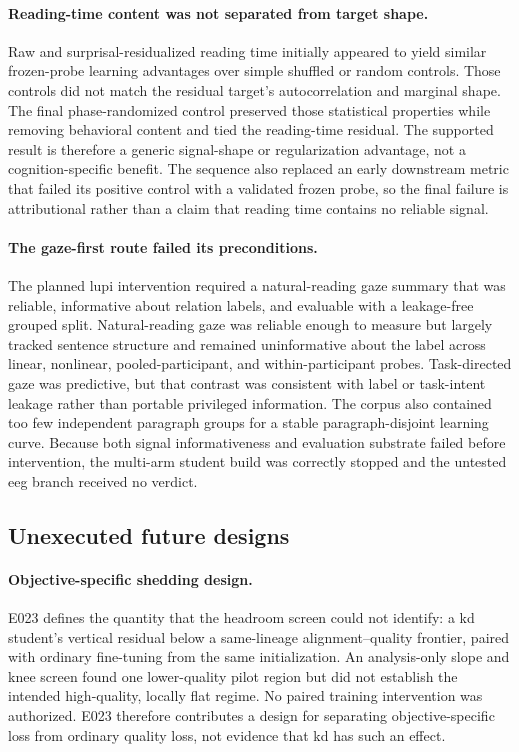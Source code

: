 \paragraph{Reading-time content was not separated from target shape.}
Raw and surprisal-residualized reading time initially appeared to yield similar frozen-probe learning advantages over simple shuffled or random controls.
Those controls did not match the residual target's autocorrelation and marginal shape.
The final phase-randomized control preserved those statistical properties while removing behavioral content and tied the reading-time residual.
The supported result is therefore a generic signal-shape or regularization advantage, not a cognition-specific benefit.
The sequence also replaced an early downstream metric that failed its positive control with a validated frozen probe, so the final failure is attributional rather than a claim that reading time contains no reliable signal. 

\paragraph{The gaze-first route failed its preconditions.}
The planned \ac{lupi} intervention required a natural-reading gaze summary that was reliable, informative about relation labels, and evaluable with a leakage-free grouped split.
Natural-reading gaze was reliable enough to measure but largely tracked sentence structure and remained uninformative about the label across linear, nonlinear, pooled-participant, and within-participant probes.
Task-directed gaze was predictive, but that contrast was consistent with label or task-intent leakage rather than portable privileged information.
The corpus also contained too few independent paragraph groups for a stable paragraph-disjoint learning curve.
Because both signal informativeness and evaluation substrate failed before intervention, the multi-arm student build was correctly stopped and the untested \ac{eeg} branch received no verdict. 

\subsection{Unexecuted future designs}

\paragraph{Objective-specific shedding design.}
E023 defines the quantity that the headroom screen could not identify: a \ac{kd} student's vertical residual below a same-lineage alignment--quality frontier, paired with ordinary fine-tuning from the same initialization.
An analysis-only slope and knee screen found one lower-quality pilot region but did not establish the intended high-quality, locally flat regime.
No paired training intervention was authorized.
E023 therefore contributes a design for separating objective-specific loss from ordinary quality loss, not evidence that \ac{kd} has such an effect. 

